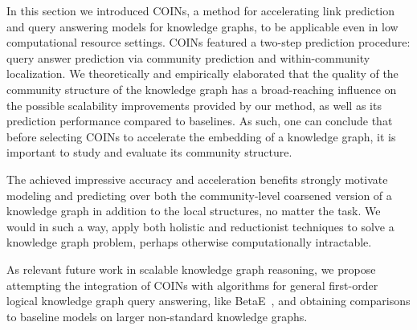In this section we introduced COINs, a method for accelerating link prediction and query answering models for knowledge graphs, to be applicable even in low computational resource settings. COINs featured a two-step prediction procedure: query answer prediction via community prediction and within-community localization. 
We theoretically and empirically elaborated that the quality of the community structure of the knowledge graph has a broad-reaching influence on the possible scalability improvements provided by our method, as well as its prediction performance compared to baselines. As such, one can conclude that before selecting COINs to accelerate the embedding of a knowledge graph, it is important to study and evaluate its community structure. 

The achieved impressive accuracy and acceleration benefits strongly motivate modeling and predicting over both the community-level coarsened version of a knowledge graph in addition to the local structures, no matter the task. We would in such a way, apply both holistic and reductionist techniques to solve a knowledge graph problem, perhaps otherwise computationally intractable.

As relevant future work in scalable knowledge graph reasoning, we propose attempting the integration of COINs with algorithms for general first-order logical knowledge graph query answering, like BetaE~\cite{ren_beta_2020}, and obtaining comparisons to baseline models on larger non-standard knowledge graphs.